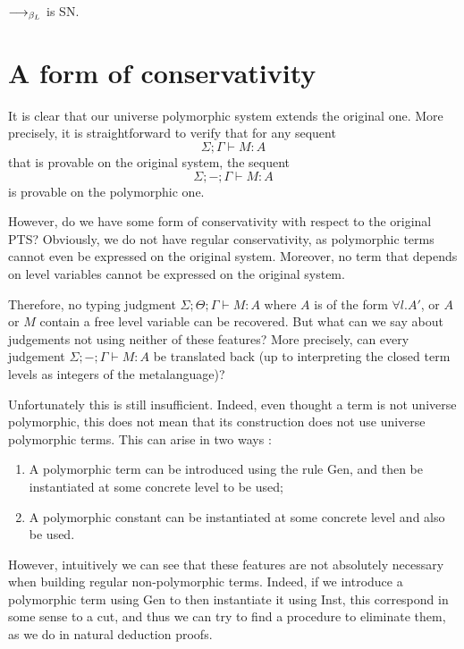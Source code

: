 \documentclass[]{StandardTemplate}
\begin{document}
\begin{prop}[]
$ \longrightarrow_{\beta_L} $ is SN.
\end{prop}

\section{A form of conservativity}
\label{sec:cons}

It is clear that our universe polymorphic system extends the original one. More precisely, it is straightforward to verify that for any sequent \[
\Sigma; \Gamma \vdash M : A
\] that is provable on the original system, the sequent \[
\Sigma;-; \Gamma \vdash M : A
\]is provable on the polymorphic one.

However, do we have some form of conservativity with respect to the original PTS? Obviously, we do not have regular conservativity, as polymorphic terms cannot even be expressed on the original system. Moreover, no term that depends on level variables cannot be expressed on the original system.

Therefore, no typing judgment $ \Sigma; \Theta; \Gamma \vdash M : A $ where $ A $ is of the form $ \forall l. A' $, or $ A $ or $ M $ contain a free level variable can be  recovered. But what can we say about judgements not using neither of these features? More precisely, can every judgement $ \Sigma; -; \Gamma \vdash M : A $ be translated back (up to interpreting the closed term levels as integers of the metalanguage)?

Unfortunately this is still insufficient. Indeed, even thought a term is not universe polymorphic, this does not mean that its construction does not use universe polymorphic terms. This can arise in two ways :
\begin{enumerate}
\item A polymorphic term can be introduced using the rule Gen, and then be instantiated at some concrete level to be used;
\item A polymorphic constant can be instantiated at some concrete level and also be used.
\end{enumerate}

However, intuitively we can see that these features are not absolutely necessary when building regular non-polymorphic terms. Indeed, if we introduce a polymorphic term using Gen to then instantiate it using Inst, this correspond in some sense to a cut, and thus we can try to find a procedure to eliminate them, as we do in natural deduction proofs.
\end{document}
